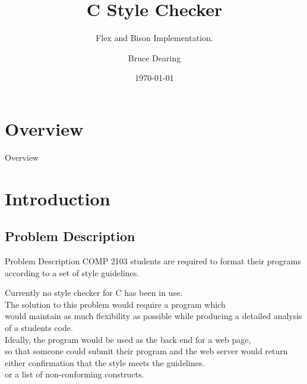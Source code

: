 \documentclass[compress]{beamer}
\title{C Style Checker}
\subtitle{Flex and Bison Implementation.}
\date{\today}
\author{Bruce Dearing}
\institute{Acadia University}
\begin{document}

\maketitle


\section*{Overview}
\begin{frame}{Overview}
    \tableofcontents[hideallsubsections]
\end{frame}


\section{Introduction}

\subsection{Problem Description}

\begin{frame}{Problem Description}
        COMP 2103 students are required to format their programs according to a set of style guidelines.
        
\note
{
	Currently no style checker for C has been in use. \\ 
    The solution to this problem would require a program
    which \\ would maintain as much flexibility as possible while producing a detailed analysis of a students code. \\
    Ideally, the program would be used as the back end for a web page, \\
    so that someone could submit their program and the web server would return either confirmation that the style meets the 
    guidelines.\\
    or a list of non-conforming constructs.
}
\end{frame}
\end{document}
